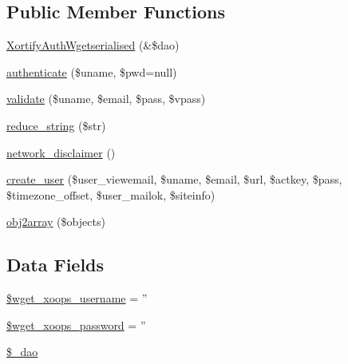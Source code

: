 \subsection*{Public Member Functions}
\begin{DoxyCompactItemize}
\item 
\hyperlink{class_xortify_auth_wgetserialised_a105dc6259614484bc637fdf1a5aa3832}{Xortify\-Auth\-Wgetserialised} (\&\$dao)
\item 
\hyperlink{class_xortify_auth_wgetserialised_a00678ba307326b734e6c679f28bea315}{authenticate} (\$uname, \$pwd=null)
\item 
\hyperlink{class_xortify_auth_wgetserialised_a91121a1b702dfd20fb65a027c8ed26ec}{validate} (\$uname, \$email, \$pass, \$vpass)
\item 
\hyperlink{class_xortify_auth_wgetserialised_ae463a3baa44e95fa5b5151ab2334df1c}{reduce\-\_\-string} (\$str)
\item 
\hyperlink{class_xortify_auth_wgetserialised_a1874c27b6f81a3f2ff9015405ad0f8bc}{network\-\_\-disclaimer} ()
\item 
\hyperlink{class_xortify_auth_wgetserialised_ac72efc5ad313a592cf6706876f56f7ec}{create\-\_\-user} (\$user\-\_\-viewemail, \$uname, \$email, \$url, \$actkey, \$pass, \$timezone\-\_\-offset, \$user\-\_\-mailok, \$siteinfo)
\item 
\hyperlink{class_xortify_auth_wgetserialised_aabc52e4f78557f0e0b360a8aaba6e11d}{obj2array} (\$objects)
\end{DoxyCompactItemize}
\subsection*{Data Fields}
\begin{DoxyCompactItemize}
\item 
\hyperlink{class_xortify_auth_wgetserialised_a237f5dcc3c161c5b1909327a90b56618}{\$wget\-\_\-xoops\-\_\-username} = ''
\item 
\hyperlink{class_xortify_auth_wgetserialised_ab9145a618042e8282ecb90d5f634311f}{\$wget\-\_\-xoops\-\_\-password} = ''
\item 
\hyperlink{class_xortify_auth_wgetserialised_a12a029c610f699b4b25e79a1f64a3485}{\$\-\_\-dao}
\end{DoxyCompactItemize}


